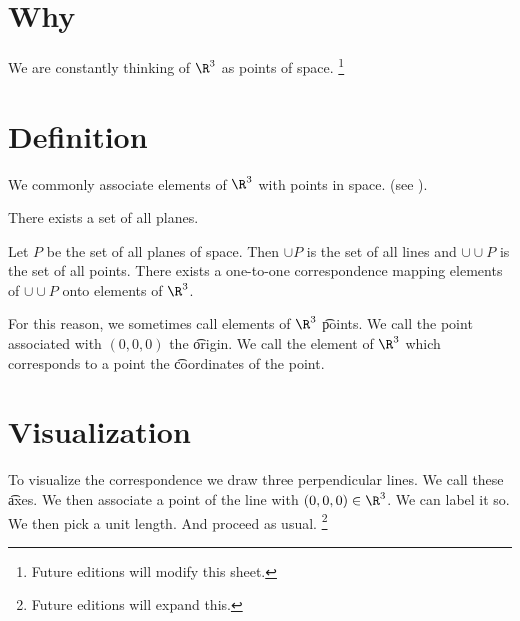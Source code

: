 
\section*{Why}

We are constantly thinking of $\R ^3$ as points of space.
    \ifhmode\unskip\fi\footnote{
Future editions will modify this sheet.
    }

\section*{Definition}

We commonly associate elements of $\R ^3$ with points in space. (see 
).
\begin{principle}
There exists a set of all planes.\end{principle}
\begin{principle}
Let $P$ be the set of all planes of space.
Then $\cup P$ is the set of all lines and $\cup \cup P$ is the set of all points.
There exists a one-to-one correspondence mapping elements of $\cup \cup P$ onto elements of $\R ^3$.\end{principle}
For this reason, we sometimes call elements of $\R ^3$ \t{points}.
We call the point associated with $(0, 0, 0)$ the \t{origin}.
We call the element of $\R ^3$ which corresponds to a point the \t{coordinates} of the point.

\section*{Visualization}

To visualize the correspondence we draw three perpendicular lines.
We call these \t{axes}.
We then associate a point of the line with $(0, 0, 0) \in \R ^3$.
We can label it so.
We then pick a unit length.
And proceed as usual.
    \ifhmode\unskip\fi\footnote{
Future editions will expand this.
    }

\blankpage